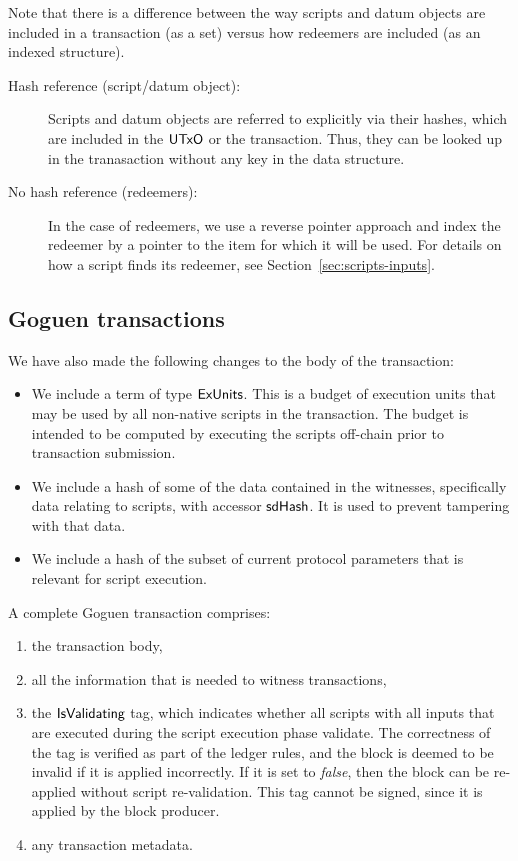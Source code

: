 Note that there is a difference between the way scripts and datum objects are included in
a transaction (as a set) versus how redeemers are included
(as an indexed structure). %

\begin{description}
\item
  [Hash reference (script/datum object):]
  Scripts and datum objects are referred to explicitly via their hashes,
  which are included in the $\mathsf{UTxO}$ or the transaction. Thus, they can be
  looked up in the tranasaction without any key in the data structure.

  \item[No hash reference (redeemers):] In the case of redeemers,
  we use a reverse pointer approach and
  index the redeemer by a pointer to the item for which it will be used.
  For details on how a script finds its redeemer, see Section~\ref{sec:scripts-inputs}.
\end{description}

\subsection{Goguen transactions}
We have also made the following changes to
the body of the transaction:

\begin{itemize}
  \item We include a term of type $\mathsf{ExUnits}$. This is a budget of execution units
  that may be used by all non-native scripts in the transaction.
  The budget is intended to be computed by executing the scripts off-chain prior to transaction submission.
  \item We include a hash of some of the data contained in the witnesses, specifically data relating to scripts,
    with accessor $\mathsf{sdHash}$. It is used to prevent tampering with that data.
  \item We include a hash of the subset of current protocol parameters that is relevant for script execution.
\end{itemize}

A complete Goguen transaction comprises:

\begin{enumerate}
  \item the transaction body,
  \item all the information that is needed to witness transactions,
  \item the $\mathsf{IsValidating}$ tag, which indicates whether all scripts with all inputs
  that are executed during the script execution phase validate.
  The correctness of the tag is verified as part of the ledger rules, and the block is
  deemed to be invalid if it is applied incorrectly.
  If it is set to \emph{false}, then the block can be re-applied without script re-validation.
  This tag cannot be signed, since it is applied by the block producer.
  \item any transaction metadata.
\end{enumerate}


